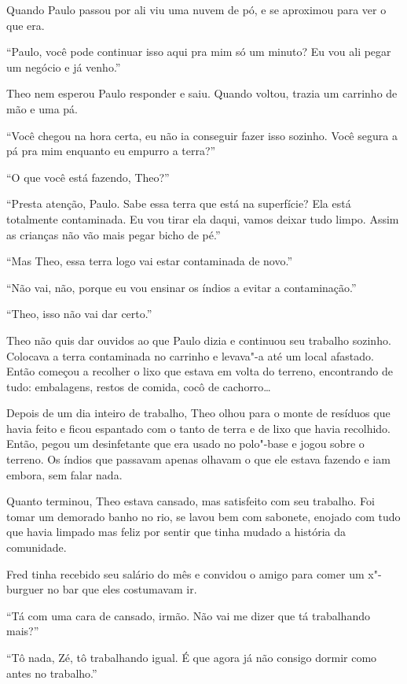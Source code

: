 Quando Paulo passou por ali viu uma nuvem de pó, e se aproximou para ver
o que era.

``Paulo, você pode continuar isso aqui pra mim só um minuto? Eu vou ali
pegar um negócio e já venho.''

Theo nem esperou Paulo responder e saiu. Quando voltou, trazia um
carrinho de mão e uma pá.

``Você chegou na hora certa, eu não ia conseguir fazer isso sozinho.
Você segura a pá pra mim enquanto eu empurro a terra?''

``O que você está fazendo, Theo?''

``Presta atenção, Paulo. Sabe essa terra que está na superfície? Ela
está totalmente contaminada. Eu vou tirar ela daqui, vamos deixar tudo
limpo. Assim as crianças não vão mais pegar bicho de pé.''

``Mas Theo, essa terra logo vai estar contaminada de novo.''

``Não vai, não, porque eu vou ensinar os índios a evitar a
contaminação.''

``Theo, isso não vai dar certo.''

Theo não quis dar ouvidos ao que Paulo dizia e continuou seu trabalho
sozinho. Colocava a terra contaminada no carrinho e levava"-a até um
local afastado. Então começou a recolher o lixo que estava em volta do
terreno, encontrando de tudo: embalagens, restos de comida, cocô de
cachorro\ldots{}

Depois de um dia inteiro de trabalho, Theo olhou para o monte de
resíduos que havia feito e ficou espantado com o tanto de terra e de
lixo que havia recolhido. Então, pegou um desinfetante que era usado no
polo"-base e jogou sobre o terreno. Os índios que passavam apenas olhavam
o que ele estava fazendo e iam embora, sem falar nada.

Quanto terminou, Theo estava cansado, mas satisfeito com seu trabalho.
Foi tomar um demorado banho no rio, se lavou bem com sabonete, enojado
com tudo que havia limpado mas feliz por sentir que tinha mudado a
história da comunidade.

\asterisc


Fred tinha recebido seu salário do mês e convidou o amigo para comer um
x"-burguer no bar que eles costumavam ir.

``Tá com uma cara de cansado, irmão. Não vai me dizer que tá trabalhando
mais?''

``Tô nada, Zé, tô trabalhando igual. É que agora já não consigo dormir
como antes no trabalho.''


